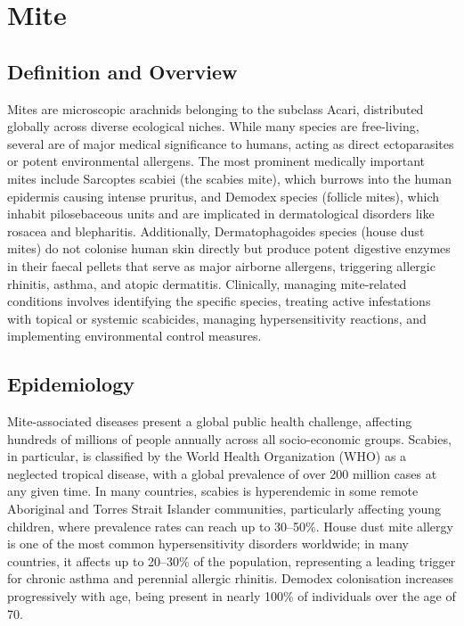 \chapter{Mite}

\section*{Definition and Overview}
Mites are microscopic arachnids belonging to the subclass Acari, distributed globally across diverse ecological niches. While many species are free-living, several are of major medical significance to humans, acting as direct ectoparasites or potent environmental allergens. The most prominent medically important mites include Sarcoptes scabiei (the scabies mite), which burrows into the human epidermis causing intense pruritus, and Demodex species (follicle mites), which inhabit pilosebaceous units and are implicated in dermatological disorders like rosacea and blepharitis. Additionally, Dermatophagoides species (house dust mites) do not colonise human skin directly but produce potent digestive enzymes in their faecal pellets that serve as major airborne allergens, triggering allergic rhinitis, asthma, and atopic dermatitis. Clinically, managing mite-related conditions involves identifying the specific species, treating active infestations with topical or systemic scabicides, managing hypersensitivity reactions, and implementing environmental control measures.

\section*{Epidemiology}
Mite-associated diseases present a global public health challenge, affecting hundreds of millions of people annually across all socio-economic groups. Scabies, in particular, is classified by the World Health Organization (WHO) as a neglected tropical disease, with a global prevalence of over 200 million cases at any given time. In many countries, scabies is hyperendemic in some remote Aboriginal and Torres Strait Islander communities, particularly affecting young children, where prevalence rates can reach up to 30--50\%. House dust mite allergy is one of the most common hypersensitivity disorders worldwide; in many countries, it affects up to 20--30\% of the population, representing a leading trigger for chronic asthma and perennial allergic rhinitis. Demodex colonisation increases progressively with age, being present in nearly 100\% of individuals over the age of 70.


